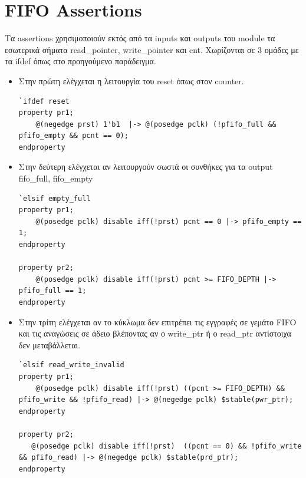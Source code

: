 \documentclass[12pt]{article}
\begin{document}
\section*{FIFO Assertions}
Τα assertions χρησιμοποιούν εκτός από τα inputs και outputs του module τα εσωτερικά σήματα read\_pointer, write\_pointer και cnt.
 Χωρίζονται σε 3 ομάδες με τα ifdef όπως στο προηγούμενο παράδειγμα. 
\begin{itemize}
\item Στην πρώτη ελέγχεται η λειτουργία του reset όπως στον counter.  
\begin{verbatim}
`ifdef reset
property pr1;
    @(negedge prst) 1'b1  |-> @(posedge pclk) (!pfifo_full && pfifo_empty && pcnt == 0);
endproperty
\end{verbatim}
\item Στην δεύτερη ελέγχεται αν λειτουργούν σωστά οι συνθήκες για τα output fifo\_full, fifo\_empty    
\begin{verbatim} 
`elsif empty_full
property pr1;
    @(posedge pclk) disable iff(!prst) pcnt == 0 |-> pfifo_empty == 1;
endproperty

property pr2;
    @(posedge pclk) disable iff(!prst) pcnt >= FIFO_DEPTH |->  pfifo_full == 1;
endproperty
\end{verbatim}
\item Στην τρίτη ελέγχεται αν το κύκλωμα δεν επιτρέπει τις εγγραφές σε γεμάτο FIFO και τις αναγώσεις σε άδειο 
βλέποντας αν ο write\_ptr ή ο read\_ptr αντίστοιχα δεν μεταβάλλεται.
\begin{verbatim} 
`elsif read_write_invalid
property pr1;
    @(posedge pclk) disable iff(!prst) ((pcnt >= FIFO_DEPTH) && pfifo_write && !pfifo_read) |-> @(negedge pclk) $stable(pwr_ptr);
endproperty

property pr2;
   @(posedge pclk) disable iff(!prst)  ((pcnt == 0) && !pfifo_write && pfifo_read) |-> @(negedge pclk) $stable(prd_ptr);
endproperty
\end{verbatim}
\end{itemize}
\end{document}
